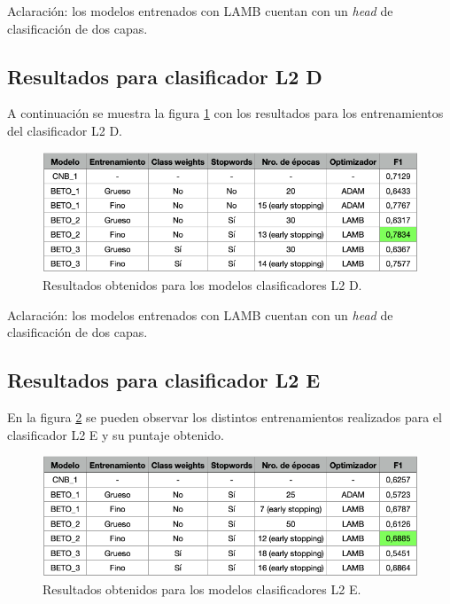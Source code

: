 Aclaración: los modelos entrenados con LAMB cuentan con un \textit{head} de clasificación de dos capas.

\subsection{Resultados para clasificador L2 D}

A continuación se muestra la figura \ref{fig:res-l2d} con los resultados para los entrenamientos del clasificador L2 D.

\begin{figure}[htbp]
	\centering
	\includegraphics[width=1\textwidth]{./Figures/cap4-resultados-l2d.png}
	\caption{Resultados obtenidos para los modelos clasificadores L2 D.}
	\label{fig:res-l2d}
\end{figure}

Aclaración: los modelos entrenados con LAMB cuentan con un \textit{head} de clasificación de dos capas.

\newpage

\subsection{Resultados para clasificador L2 E}

En la figura \ref{fig:res-l2e} se pueden observar los distintos entrenamientos realizados para el clasificador L2 E y su puntaje obtenido.

\begin{figure}[H]
	\centering
	\includegraphics[width=1\textwidth]{./Figures/cap4-resultados-l2e.png}
	\caption{Resultados obtenidos para los modelos clasificadores L2 E.}
	\label{fig:res-l2e}
\end{figure}

